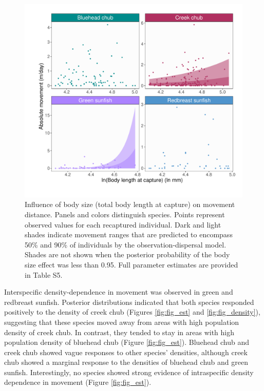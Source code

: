 \documentclass[11pt, class=article, crop=false]{standalone}
\begin{document}
\begin{figure}
    \centering
    \includegraphics[width=0.75\linewidth]{output/fig_size.pdf}
    \caption{Influence of body size (total body length at capture) on movement distance. Panels and colors distinguish species. Points represent observed values for each recaptured individual. Dark and light shades indicate movement ranges that are predicted to encompass 50\% and 90\% of individuals by the observation-dispersal model. Shades are not shown when the posterior probability of the body size effect was less than 0.95. Full parameter estimates are provided in Table S5.}
    \label{fig:fig_size}
\end{figure}

Interspecific density-dependence in movement was observed in green and redbreast sunfish. Posterior distributions indicated that both species responded positively to the density of creek chub (Figures \ref{fig:fig_est} and \ref{fig:fig_density}), suggesting that these species moved away from areas with high population density of creek chub. 
In contrast, they tended to stay in areas with high population density of bluehead chub (Figure \ref{fig:fig_est}).
Bluehead chub and creek chub showed vague responses to other species' densities, although creek chub showed a marginal response to the densities of bluehead chub and green sunfish.
Interestingly, no species showed strong evidence of intraspecific density dependence in movement (Figure \ref{fig:fig_est}).
\end{document}
